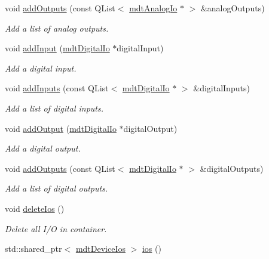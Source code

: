 \begin{DoxyCompactItemize}
void \hyperlink{classmdt_multi_io_device_a313df6923c8fe4df9405f5222c46986e}{add\-Outputs} (const Q\-List$<$ \hyperlink{classmdt_analog_io}{mdt\-Analog\-Io} $\ast$ $>$ \&analog\-Outputs)
\begin{DoxyCompactList}\small\item\em Add a list of analog outputs. \end{DoxyCompactList}\item 
void \hyperlink{classmdt_multi_io_device_ada49d6af77fc3b6e435d14b6254d5862}{add\-Input} (\hyperlink{classmdt_digital_io}{mdt\-Digital\-Io} $\ast$digital\-Input)
\begin{DoxyCompactList}\small\item\em Add a digital input. \end{DoxyCompactList}\item 
void \hyperlink{classmdt_multi_io_device_aa1911b274aba6b0bd3b4ae6de7653e06}{add\-Inputs} (const Q\-List$<$ \hyperlink{classmdt_digital_io}{mdt\-Digital\-Io} $\ast$ $>$ \&digital\-Inputs)
\begin{DoxyCompactList}\small\item\em Add a list of digital inputs. \end{DoxyCompactList}\item 
void \hyperlink{classmdt_multi_io_device_aaeda5a4dba892677f7c63e621dade8b0}{add\-Output} (\hyperlink{classmdt_digital_io}{mdt\-Digital\-Io} $\ast$digital\-Output)
\begin{DoxyCompactList}\small\item\em Add a digital output. \end{DoxyCompactList}\item 
void \hyperlink{classmdt_multi_io_device_a2229d9620e3f93d7387408526c4c5524}{add\-Outputs} (const Q\-List$<$ \hyperlink{classmdt_digital_io}{mdt\-Digital\-Io} $\ast$ $>$ \&digital\-Outputs)
\begin{DoxyCompactList}\small\item\em Add a list of digital outputs. \end{DoxyCompactList}\item 
void \hyperlink{classmdt_multi_io_device_ae712551100e5c45eaaf197dd9e409716}{delete\-Ios} ()
\begin{DoxyCompactList}\small\item\em Delete all I/\-O in container. \end{DoxyCompactList}\item 
std\-::shared\-\_\-ptr$<$ \hyperlink{classmdt_device_ios}{mdt\-Device\-Ios} $>$ \hyperlink{classmdt_multi_io_device_a1acf6876006ca28b93a6ad0be0b39eff}{ios} ()

\end{DoxyCompactItemize}

